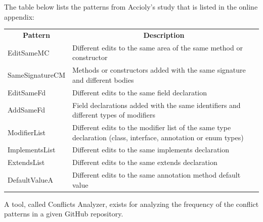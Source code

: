 The table below lists the patterns from Accioly’s study that is listed in the online appendix:\\ %
\begin{tabular}{| l | p{12cm} |}
\hline
\multicolumn{1}{c}{\textbf{Pattern}} & \multicolumn{1}{c}{\textbf{Description}}\\
EditSameMC & Different edits to the same area of the same method or constructor\\
SameSignatureCM & Methods or constructors added with the same signature and different bodies\\
EditSameFd & Different edits to the same field declaration\\
AddSameFd & Field declarations added with the same identifiers and different types of modifiers\\
ModifierList & Different edits to the modifier list of the same type declaration (class, interface, annotation or enum types)\\
ImplementsList & Different edits to the same implements declaration\\
ExtendsList & Different edits to the same extends declaration\\
DefaultValueA & Different edits to the same annotation method default value
\end{tabular}

A tool, called Conflicts Analyzer, exists for analyzing the frequency of the conflict patterns in a given GitHub repository.
